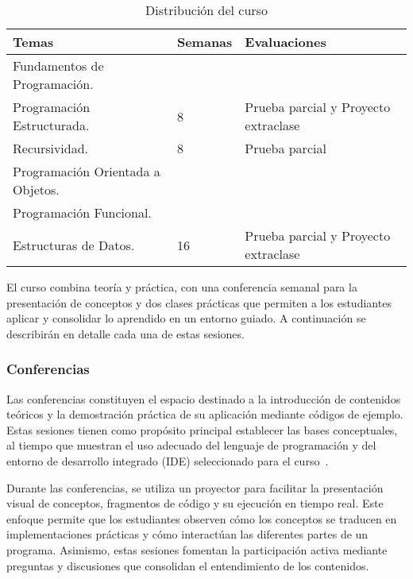 \documentclass{article}
\begin{document}
\begin{table}[h!]
    \centering
    \begin{tabular}{|p{5cm}|p{2cm}|p{3cm}|}
    \hline
    \textbf{Temas} & \textbf{Semanas} & \textbf{Evaluaciones} \\ \hline
    \raggedright Fundamentos de Programación. \\ Programación Estructurada. 
    & 8 & Prueba parcial y Proyecto extraclase \\ \hline
    \raggedright Recursividad.
    & 8 & Prueba parcial \\ \hline
    \raggedright Programación Orientada a Objetos. \\ Programación Funcional. \\ Estructuras de Datos. 
    & 16 & Prueba parcial y Proyecto extraclase \\ \hline
    \end{tabular}
    \caption{Distribución del curso}\label{tab:course_distribution}
\end{table}
    

El curso combina teoría y práctica, con una conferencia semanal para la presentación de conceptos y dos clases prácticas que permiten a los estudiantes aplicar y consolidar lo aprendido en un entorno guiado. A continuación se describirán en detalle cada una de estas sesiones.

\subsubsection{Conferencias}

Las conferencias constituyen el espacio destinado a la introducción de contenidos teóricos y la demostración práctica de su aplicación mediante códigos de ejemplo. Estas sesiones tienen como propósito principal establecer las bases conceptuales, al tiempo que muestran el uso adecuado del lenguaje de programación y del entorno de desarrollo integrado (IDE) seleccionado para el curso~\cite{plan_estudio_e_2017}.

Durante las conferencias, se utiliza un proyector para facilitar la presentación visual de conceptos, fragmentos de código y su ejecución en tiempo real. Este enfoque permite que los estudiantes observen cómo los conceptos se traducen en implementaciones prácticas y cómo interactúan las diferentes partes de un programa. Asimismo, estas sesiones fomentan la participación activa mediante preguntas y discusiones que consolidan el entendimiento de los contenidos.
\end{document}
